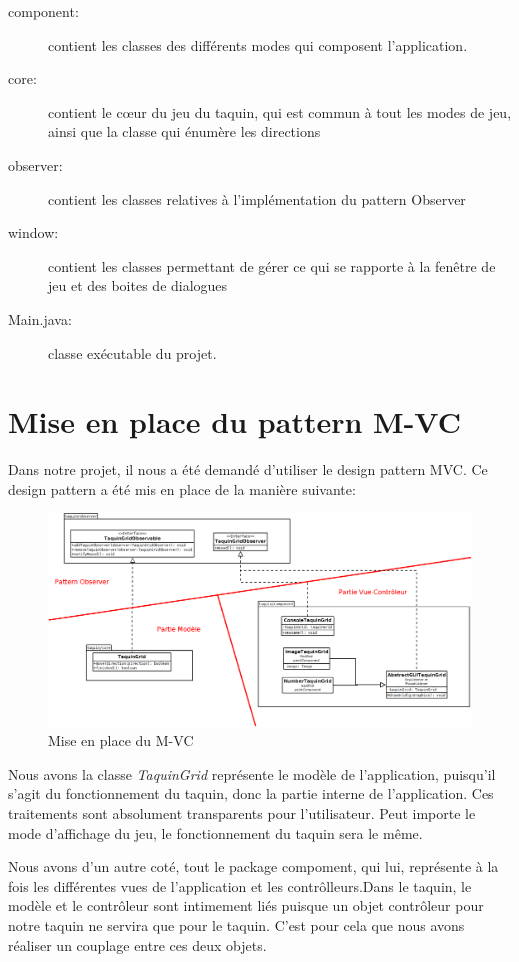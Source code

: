 		\begin{description}
			\item [component:] contient les classes des différents modes qui composent l’application.
			\item [core:] contient le cœur du jeu du taquin, qui est commun à tout les modes de jeu, ainsi que la classe qui énumère les directions
			\item [observer:] contient les classes relatives à l'implémentation du pattern Observer
			\item [window:] contient les classes permettant de gérer ce qui se rapporte à la fenêtre de jeu et des boites de dialogues
			\item [Main.java:] classe exécutable du projet.
		\end{description}

	\section{Mise en place du pattern M-VC}

	Dans notre projet, il nous a été demandé d'utiliser le design pattern MVC. Ce design pattern a été mis en place de la manière suivante:

	\begin{figure}[H]
		\centering\includegraphics[width=1\textwidth, keepaspectratio]{img/diagramMVC.png}
		\caption{Mise en place du M-VC}
	\end{figure}

	Nous avons la classe \textit{TaquinGrid} représente le modèle de l'application, puisqu'il s'agit du fonctionnement du taquin, donc la partie interne de l'application. Ces traitements sont absolument transparents pour l'utilisateur. Peut importe le mode d'affichage du jeu, le fonctionnement du taquin sera le même.

	Nous avons d'un autre coté, tout le package compoment, qui lui, représente à la fois les différentes vues de l'application et les contrôlleurs.Dans le taquin, le modèle et le contrôleur sont intimement liés puisque un objet contrôleur pour notre taquin ne servira que pour le taquin. C'est pour cela que nous avons réaliser un couplage entre ces deux objets.

